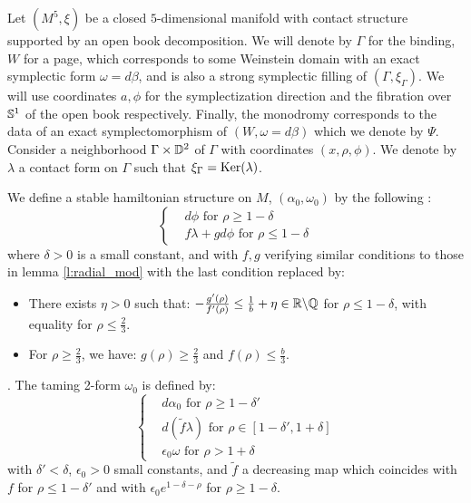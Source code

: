 \documentclass[../main.tex]{subfiles}
\begin{document}
Let $(M^5,\xi)$ be a closed $5$-dimensional manifold with contact structure supported by an open book decomposition. We will denote by $\Gamma$ for the binding, $W$ for a page, which corresponds to some Weinstein domain with an exact symplectic form $\omega = d\beta$, and is also a strong symplectic filling of $(\Gamma,\xi_\Gamma)$. We will use coordinates $a,\phi$ for the symplectization direction and the fibration over $\mathbb{S}^1$ of the open book respectively. Finally, the monodromy corresponds to the data of an exact symplectomorphism of $(W,\omega = d\beta)$ which we denote by $\Psi$. Consider a neighborhood $\Gamma\times \mathbb{D}^2$ of $\Gamma$ with coordinates $(x,\rho,\phi)$. We denote by $\lambda$ a contact form on $\Gamma$ such that $\xi_{\Gamma} = \text{Ker}(\lambda)$.

\begin{definition}\label{d:SHS_5D}
We define a stable hamiltonian structure on $M$, $(\alpha_0,\omega_0)$ by the following :
\begin{equation}
\left\{
    \begin{array}{ll}
     & d\phi \mbox{ for  } \rho\geq 1-\delta\\ 
     & f\lambda + gd\phi \mbox{ for } \rho \leq 1-\delta 
    \end{array}
\right.
\end{equation}
where $\delta> 0$ is a small constant, and with $f,g$ verifying similar conditions to those in lemma \ref{l:radial_mod} with the last condition replaced by: 
\begin{itemize}
    \item There exists $\eta > 0$ such that: $-\frac{g'(\rho)}{f'(\rho)}\leq \frac{1}{b} + \eta\in \mathbb{R}\backslash \mathbb{Q}$ for $\rho \leq 1-\delta$, with equality for $\rho\leq \frac{2}{3}$.
    \item For $\rho \geq \frac{2}{3}$, we have: $g(\rho)\geq \frac{2}{3}$ and $f(\rho)\leq \frac{b}{3}$.
\end{itemize}.
The taming 2-form $\omega_0$ is defined by: 
\begin{equation}
\left\{
    \begin{array}{ll}
     & d\alpha_0 \mbox{ for  } \rho\geq 1-\delta'\\ 
     & d(\tilde f \lambda) \mbox{ for } \rho \in [1-\delta',1+\delta] \\
     & \epsilon_0\omega \mbox{ for } \rho > 1+\delta
    \end{array}
\right.
\end{equation}
with $\delta'< \delta$, $\epsilon_0 > 0$ small constants, and $\tilde{f}$ a decreasing map which coincides with $f$ for $\rho \leq 1-\delta'$ and with $\epsilon_0e^{1-\delta - \rho}$ for $\rho \geq 1-\delta$.
\end{definition}
\end{document}
